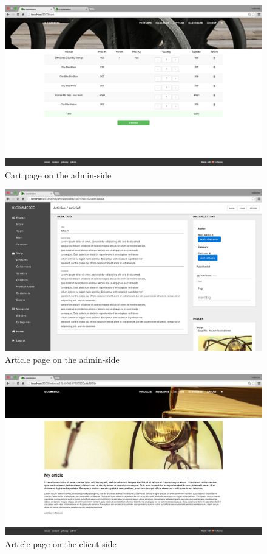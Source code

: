 \begin{figure}[htb]
\centering
\includegraphics[width=1.0\linewidth]{images/chapter4/page-cart.png}\hfill
\caption[Cart page on the admin-side]{Cart page on the admin-side}
\label{fig:page_cart_cli}
\end{figure}
\newpage
\begin{figure}[htb]
\centering
\includegraphics[width=1.0\linewidth]{images/chapter4/page-article-adm.png}\hfill
\caption[Article page on the admin-side]{Article page on the admin-side}
\label{fig:page_article_admin}
\end{figure}
\begin{figure}[htb]
\centering
\includegraphics[width=1.0\linewidth]{images/chapter4/page-article-cli.png}\hfill
\caption[Article page on the client-side]{Article page on the client-side}
\label{fig:page_article_cli}
\end{figure}

